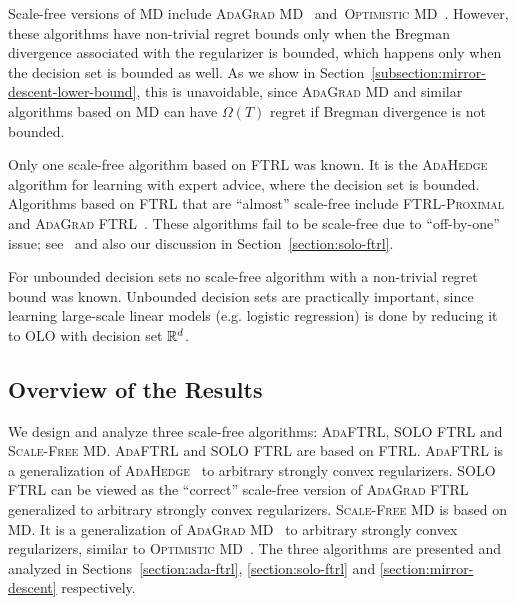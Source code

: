 Scale-free versions of \textsc{MD} include \textsc{AdaGrad
MD}~\cite{Duchi-Hazan-Singer-2011} and~\textsc{Optimistic
MD}~\cite{Rakhlin-Sridharan-2013}. However, these algorithms have non-trivial
regret bounds only when the Bregman divergence associated with the regularizer
is bounded, which happens only when the decision set is bounded as well. As we
show in Section~\ref{subsection:mirror-descent-lower-bound}, this is
unavoidable, since \textsc{AdaGrad MD} and similar algorithms based on
\textsc{MD} can have $\Omega(T)$ regret if Bregman divergence is not bounded.

Only one scale-free algorithm based on \textsc{FTRL} was known. It is the
\textsc{AdaHedge}~\cite{de-Rooij-van-Erven-Grunwald-Koolen-2014} algorithm for
learning with expert advice, where the decision set is bounded.
Algorithms based on \textsc{FTRL} that are ``almost'' scale-free include
\textsc{FTRL-Proximal}~\cite{McMahan-Streeter-2010,McMahan-2014} and
\textsc{AdaGrad FTRL}~\cite{Duchi-Hazan-Singer-2011}.  These algorithms fail to
be scale-free due to ``off-by-one'' issue; see~\cite{McMahan-2014} and also our
discussion in Section~\ref{section:solo-ftrl}.

For unbounded decision sets no scale-free algorithm with a non-trivial regret
bound was known. Unbounded decision sets are practically important, since
learning large-scale linear models (e.g. logistic regression) is done by
reducing it to OLO with decision set $\mathbb{R}^d$.

\subsection{Overview of the Results}

We design and analyze three scale-free algorithms: \textsc{AdaFTRL},
\textsc{SOLO FTRL} and \textsc{Scale-Free MD}.  \textsc{AdaFTRL} and
\textsc{SOLO FTRL} are based on \textsc{FTRL}.  \textsc{AdaFTRL} is a
generalization of
\textsc{AdaHedge}~\cite{de-Rooij-van-Erven-Grunwald-Koolen-2014} to arbitrary
strongly convex regularizers.  \textsc{SOLO FTRL} can be viewed as the
``correct'' scale-free version of \textsc{AdaGrad
FTRL}~\cite{Duchi-Hazan-Singer-2011} generalized to arbitrary strongly convex
regularizers.  \textsc{Scale-Free MD} is based on \textsc{MD}. It is a
generalization of \textsc{AdaGrad MD}~\cite{Duchi-Hazan-Singer-2011} to
arbitrary strongly convex regularizers, similar to \textsc{Optimistic
MD}~\cite{Rakhlin-Sridharan-2013}.  The three algorithms are presented and
analyzed in Sections~\ref{section:ada-ftrl}, \ref{section:solo-ftrl} and
\ref{section:mirror-descent} respectively.

